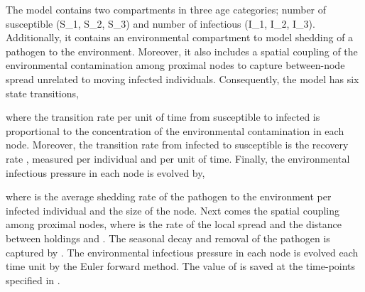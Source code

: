 \documentclass[letterpaper]{book}
\begin{document}
\begin{Details}
The  model contains two compartments in three age
categories; number of susceptible (S\_1, S\_2, S\_3) and number of
infectious (I\_1, I\_2, I\_3). Additionally, it contains an
environmental compartment to model shedding of a pathogen to the
environment. Moreover, it also includes a spatial coupling of the
environmental contamination among proximal nodes to capture
between-node spread unrelated to moving infected
individuals. Consequently, the model has six state transitions,







where the transition rate per unit of time from susceptible to
infected is proportional to the concentration of the environmental
contamination \eqn{\varphi}{} in each node. Moreover, the
transition rate from infected to susceptible is the recovery rate
, measured per individual and
per unit of time. Finally, the environmental infectious pressure
in each node is evolved by,


where \eqn{\alpha}{} is the average shedding rate of the pathogen to
the environment per infected individual and  the size of the node. Next comes the
spatial coupling among proximal nodes, where  is the rate
of the local spread and  the distance between holdings
 and . The seasonal decay and removal of the
pathogen is captured by . The environmental
infectious pressure  in each node is
evolved each time unit by the Euler forward method. The value of
 is saved at the time-points specified in
.


\end{Details}
\end{document}
